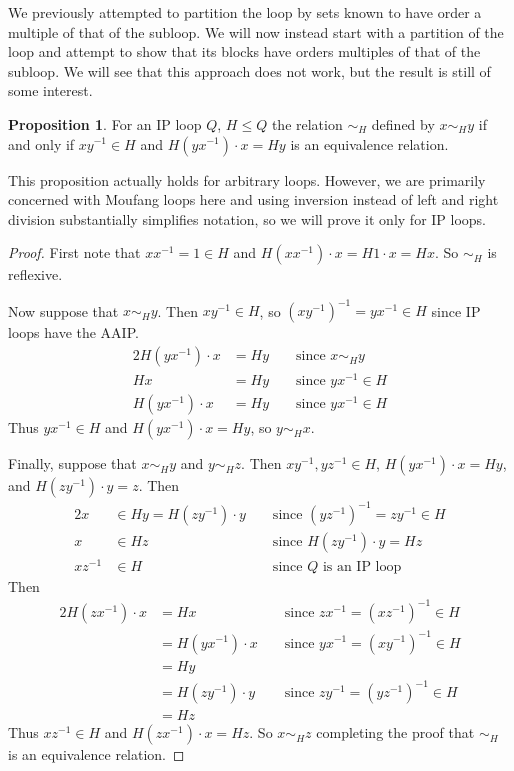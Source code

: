 \documentclass[12pt]{report}
\theoremstyle{definition}
\newtheorem{prp}[thm]{Proposition}
\begin{document}
We previously attempted to partition the loop by sets known to have order a multiple of that of
  the subloop. We will now instead start with a partition of the loop and attempt to show that
  its blocks have orders multiples of that of the subloop. We will see that this approach does
  not work, but the result is still of some interest.

\begin{prp}
  For an IP loop $Q$, $H\leq Q$ the relation $\sim_H$ defined by $x\sim_H y$ if and only if $xy^{-1} \in H$
    and $H(yx^{-1})\cdot x = Hy$ is an equivalence relation.
\end{prp}

This proposition actually holds for arbitrary loops. However, we are primarily concerned with Moufang
  loops here and using inversion instead of left and right division substantially simplifies notation,
  so we will prove it only for IP loops.

\begin{proof}
  First note that $xx^{-1} = 1\in H$ and $H(xx^{-1})\cdot x = H1\cdot x = Hx$. So $\sim_H$ is reflexive.

  Now suppose that $x\sim_H y$. Then $xy^{-1}\in H$, so $(xy^{-1})^{-1} = yx^{-1}\in H$ since IP loops
    have the AAIP.
  \begin{alignat*}{2}
    H(yx^{-1})\cdot x &= Hy &&\text{ since $x\sim_H y$}\\
    Hx &= Hy &&\text{ since $yx^{-1}\in H$}\\
    H(yx^{-1})\cdot x &= Hy &&\text{ since $yx^{-1}\in H$} 
  \end{alignat*}
  Thus $yx^{-1}\in H$ and $H(yx^{-1})\cdot x = Hy$, so $y\sim_H x$.

  Finally, suppose that $x\sim_H y$ and $y\sim_H z$. Then $xy^{-1}, yz^{-1}\in H$,
    $H(yx^{-1})\cdot x = Hy$, and $H(zy^{-1})\cdot y = z$. Then
  \begin{alignat*}{2}
    x&\in Hy = H(zy^{-1})\cdot y &&\text{ since $(yz^{-1})^{-1} = zy^{-1}\in H$}\\
    x&\in Hz &&\text{ since $H(zy^{-1})\cdot y = Hz$}\\
    xz^{-1}&\in H &&\text{ since $Q$ is an IP loop}
  \end{alignat*}
  Then
  \begin{alignat*}{2}
    H(zx^{-1})\cdot x &= Hx &&\text{ since $zx^{-1} = (xz^{-1})^{-1}\in H$}\\
    &= H(yx^{-1})\cdot x &&\text{ since $yx^{-1} = (xy^{-1})^{-1}\in H$}\\
    &= Hy &&\\
    &= H(zy^{-1})\cdot y &&\text{ since $zy^{-1} = (yz^{-1})^{-1}\in H$}\\
    &= Hz &&
  \end{alignat*}
  Thus $xz^{-1}\in H$ and $H(zx^{-1})\cdot x = Hz$. So $x\sim_H z$ completing the proof that
    $\sim_H$ is an equivalence relation.
\end{proof}
\end{document}
